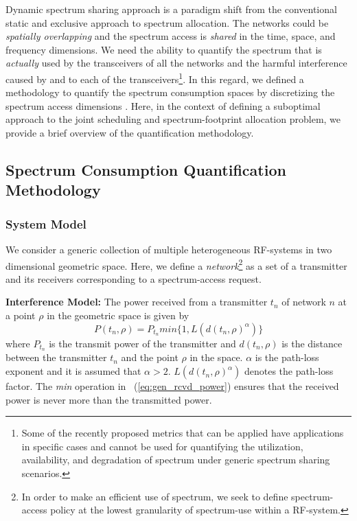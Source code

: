 \documentclass[12pt, draftclsnofoot, onecolumn]{IEEEtran}
\begin{document}
Dynamic spectrum sharing approach is a paradigm shift from the conventional static and exclusive approach to spectrum allocation. The networks could be \textit{spatially overlapping} and the spectrum access is \textit{shared} in the time, space, and frequency dimensions. We need the ability to quantify the spectrum that is \textit{actually} used by the transceivers of all the networks and the harmful interference caused by and to each of the transceivers\footnote{Some of the recently proposed metrics \cite{fccmetrics, xgmetrics, tandra_metrics} that can be applied have applications in specific cases and cannot be used for quantifying the utilization, availability, and degradation of spectrum under generic spectrum sharing scenarios.}. In this regard, we defined a methodology to quantify the spectrum consumption spaces by discretizing the spectrum access dimensions \cite{oms1_sl}. Here, in the context of defining a suboptimal approach to the joint scheduling and spectrum-footprint allocation problem, we provide a brief overview of the quantification methodology.

\subsection{Spectrum Consumption Quantification Methodology}

\noindent
\subsubsection{System Model}
We consider a generic collection of multiple heterogeneous RF-systems in two dimensional geometric space. Here, we define a \textit{network}\footnote{In order to make an efficient use of spectrum, we seek to define spectrum-access policy at the lowest granularity of spectrum-use within a RF-system.} as a set of a transmitter and its receivers corresponding to a spectrum-access request. 

\noindent
\textbf{Interference Model:}
\noindent
The power received from a transmitter $t_n$ of network $n$ at a point $\rho$ in the geometric space is given by 
\begin{equation}
\label{eq:gen_rcvd_power}
P(t_n, \rho) = P_{t_n} min\Big\{1, L({d(t_n,\rho)}^{\alpha})\Big\}
\end{equation}
where $P_{t_n}$ is the transmit power of the transmitter and $d(t_n,\rho)$ is the distance between the transmitter $t_n$ and the point $\rho$ in the space. ${\alpha}$ is the path-loss exponent and it is assumed that $\alpha > 2$.  $L({d(t_n,\rho)}^{\alpha})$ denotes the path-loss factor. The \textit{min} operation in ~(\ref{eq:gen_rcvd_power}) ensures that the received power is never more than the transmitted power.
\end{document}
